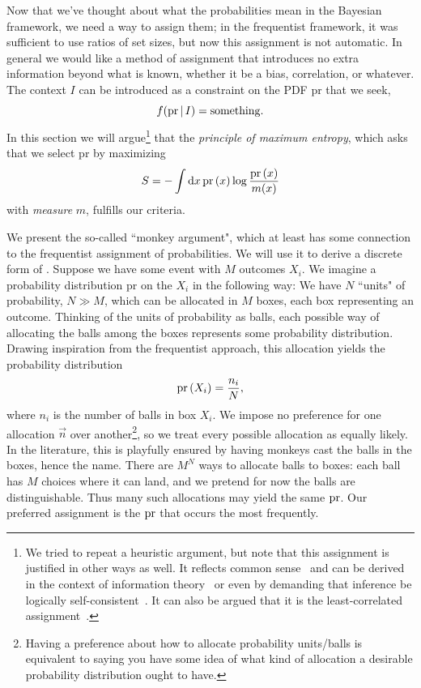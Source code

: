 Now that we've thought about what the probabilities mean in the Bayesian
framework, we need a way to assign them; in the frequentist framework, it was
sufficient to use ratios of set sizes, but now this assignment is not automatic.
In general we would like a method of assignment that introduces no extra
information beyond what is known, whether it be a bias, correlation, or
whatever. The context $I$ can be introduced as a constraint
on the PDF pr that we seek,
\begin{equation}
f({\rm pr}\,|\, I)={\rm something}.
\end{equation}
In this section we will argue\footnote{We tried to repeat a heuristic argument,
but note that this assignment is justified in other ways as well.
It reflects common sense~\cite{jaynes_foundations_1963} and
can be derived in the context of information 
theory~\cite{shannon_mathematical_1948} or even by demanding
that inference be logically 
self-consistent~\cite{shore_axiomatic_1980}. It can also be argued
that it is the least-correlated assignment~\cite{Skilling1988}.} 
that the {\it principle of maximum 
entropy}, which asks that we select
pr by maximizing
\begin{equation}\label{eq:ShannonEntropy}
S=-\int \dd{x} \pr{x} \log \frac{\pr{x}}{m(x)}
\end{equation}
with {\it measure} $m$, fulfills our criteria.


We present the so-called ``monkey argument", which at least has some connection
to the frequentist assignment of probabilities. We will use it to derive a
discrete form of . Suppose we have some event with $M$
outcomes $X_i$. We imagine a probability distribution pr on the $X_i$ in the
following way: We have $N$ ``units" of probability, $N\gg M$, which can be
allocated in $M$ boxes, each box representing an outcome. Thinking of the
units of probability as balls, each possible way of allocating the balls among
the boxes represents some probability distribution. Drawing inspiration from the
frequentist approach, this allocation yields the probability distribution
\begin{equation}\label{eq:entropyProbability}
\pr{X_i}=\frac{n_i}{N},
\end{equation}
where $n_i$ is the number of balls in box $X_i$. We impose no
preference for one allocation $\vec{n}$ over another\footnote{Having a preference about
how to allocate probability units/balls is equivalent to saying you have some
idea of what kind of allocation a desirable probability distribution ought to
have.}, so we treat every
possible allocation as equally likely. In the literature, this is playfully
ensured by having monkeys cast the balls in the boxes, hence the name.
There are $M^N$ ways to allocate balls to boxes: each ball has $M$ choices where
it can land, and we pretend for now the balls are distinguishable. Thus many such allocations
may yield the same $\pr$. Our preferred assignment is the $\pr$ that occurs the most 
frequently.

